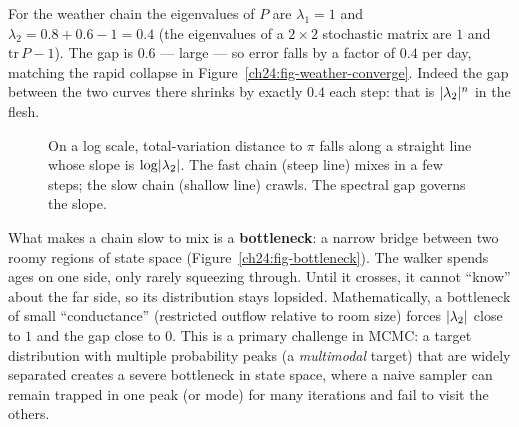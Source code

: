 For the weather chain the eigenvalues of $P$ are $\lambda_1 = 1$ and
$\lambda_2 = 0.8 + 0.6 - 1 = 0.4$ (the eigenvalues of a $2\times2$ stochastic
matrix are $1$ and $\mathrm{tr}\,P - 1$). The gap is $0.6$ --- large --- so error
falls by a factor of $0.4$ per day, matching the rapid collapse in
Figure~\ref{ch24:fig-weather-converge}. Indeed the gap between the two curves
there shrinks by exactly $0.4$ each step: that is $\lvert\lambda_2\rvert^n$ in the flesh.

\begin{figure}[H]
  \centering
  \caption{On a log scale, total-variation distance to $\pi$ falls along a
  straight line whose slope is $\log\lvert\lambda_2\rvert$. The fast chain (steep line)
  mixes in a few steps; the slow chain (shallow line) crawls. The spectral gap governs the slope.}
  \label{ch24:fig-mixing-rate}
\end{figure}

\begin{intuitionbox}
What makes a chain slow to mix is a \textbf{bottleneck}: a narrow bridge between
two roomy regions of state space (Figure~\ref{ch24:fig-bottleneck}). The walker
spends ages on one side, only rarely squeezing through. Until it crosses, it
cannot ``know'' about the far side, so its distribution stays lopsided.
Mathematically, a bottleneck of small ``conductance'' (restricted outflow relative
to room size) forces $\lvert\lambda_2\rvert$ close to $1$ and the gap close to $0$. This
is a primary challenge in MCMC: a target distribution with multiple probability peaks (a \emph{multimodal} target) that are widely separated
creates a severe bottleneck in state space, where a naive sampler can remain trapped in
one peak (or mode) for many iterations and fail to visit the others.
\end{intuitionbox}

